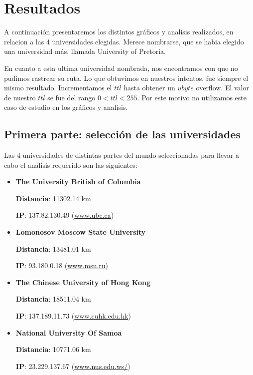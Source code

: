 \section{Resultados}
A continuaci\'on presentaremos los distintos gr\'aficos y analisis realizados, en relacion a las 4 universidades elegidas. Merece nombrarse, que se habia elegido una universidad m\'as, llamada University of Pretoria.

En cuanto a esta ultima universidad nombrada, nos encontramos con que no pudimos rastrear su ruta. Lo que obtuvimos en nuestros intentos, fue siempre el mismo resultado. Incrementamos el $ttl$ hasta obtener un $ubyte$ overflow. El valor de nuestro $ttl$ se fue del rango $0 < ttl < 255$.
Por este motivo no utilizamos este caso de estudio en los gr\'aficos y analisis.






\subsection{Primera parte: selección de las universidades}
Las 4 universidades de distintas partes del mundo seleccionadas para llevar a cabo el análisis requerido son las siguientes: 

\begin{itemize}
 \item {\bf The University British of Columbia}
 
	{\bf Distancia}: 11302.14 km 
	
	{\bf IP}: 137.82.130.49 (\url{www.ubc.ca}{})
 
 \item {\bf Lomonosov Moscow State University}

	{\bf Distancia}: 13481.01 km
	
	{\bf IP}: 93.180.0.18 (\url{www.msu.ru}{})
 
 \item {\bf The Chinese University of Hong Kong}

	{\bf Distancia}: 18511.04 km
	
	{\bf IP}: 137.189.11.73 (\url{www.cuhk.edu.hk})
 
 \item {\bf National University Of Samoa}
 
	{\bf Distancia}: 10771.06 km
	
	{\bf IP}: 23.229.137.67 (\url{www.nus.edu.ws/}{})
 
\end{itemize}

